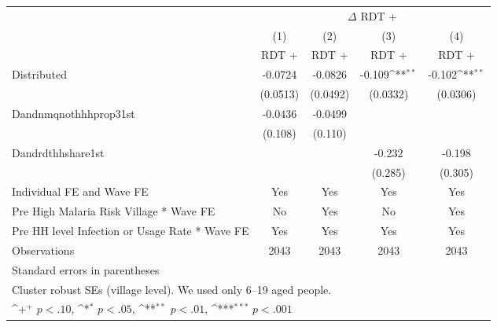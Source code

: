 {
\def\sym#1{\ifmmode^{#1}\else\(^{#1}\)\fi}
\begin{tabular}{l*{4}{c}}
\hline\hline
                    &\multicolumn{4}{c}{$\Delta $ RDT +}                                                    \\
                    &\multicolumn{1}{c}{(1)}&\multicolumn{1}{c}{(2)}&\multicolumn{1}{c}{(3)}&\multicolumn{1}{c}{(4)}\\
                    &\multicolumn{1}{c}{RDT +}&\multicolumn{1}{c}{RDT +}&\multicolumn{1}{c}{RDT +}&\multicolumn{1}{c}{RDT +}\\
\hline
Distributed         &     -0.0724         &     -0.0826         &      -0.109\sym{**} &      -0.102\sym{**} \\
                    &    (0.0513)         &    (0.0492)         &    (0.0332)         &    (0.0306)         \\
[1em]
Dandnmqnothhhprop31st&     -0.0436         &     -0.0499         &                     &                     \\
                    &     (0.108)         &     (0.110)         &                     &                     \\
[1em]
Dandrdthhshare1st   &                     &                     &      -0.232         &      -0.198         \\
                    &                     &                     &     (0.285)         &     (0.305)         \\
[1em]
Individual FE and Wave FE &         Yes         &         Yes         &         Yes         &         Yes         \\
[1em]
Pre High Malaria Risk Village * Wave FE&          No         &         Yes         &          No         &         Yes         \\
[1em]
Pre HH level Infection or Usage Rate * Wave FE&         Yes         &         Yes         &         Yes         &         Yes         \\
\hline
Observations        &        2043         &        2043         &        2043         &        2043         \\
\hline\hline
\multicolumn{5}{l}{\footnotesize Standard errors in parentheses}\\
\multicolumn{5}{l}{\footnotesize Cluster robust SEs (village level). We used only 6--19 aged people. }\\
\multicolumn{5}{l}{\footnotesize \sym{+} \(p<.10\), \sym{*} \(p<.05\), \sym{**} \(p<.01\), \sym{***} \(p<.001\)}\\
\end{tabular}
}

